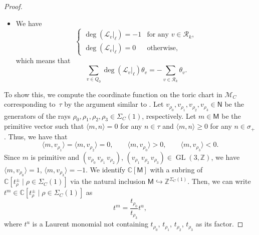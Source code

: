 \documentclass[10pt,a4paper]{amsart}
\numberwithin{equation}{section}
\theoremstyle{definition}
\newcommand{\ZZ}{\mathbb{Z}}
\newcommand{\CC}{\mathbb{C}}
\newcommand{\calL}{\mathcal{L}}
\newcommand{\calM}{\mathcal{M}}
\newcommand{\calR}{\mathcal{R}}
\newcommand{\sfM}{\mathsf{M}}
\newcommand{\sfN}{\mathsf{N}}
\newcommand{\GL}{\operatorname{GL}}
\begin{document}
\begin{proof}
\begin{itemize}
\begin{equation}
\begin{cases}
\deg(\calL_v |_\ell)=1 & \text{for any $v\in \calR_k$},\\
\deg(\calL_v |_\ell)=0 & \text{otherwise},
\end{cases}
\end{equation}
which means that
\begin{equation}
\label{eq_degree_linebdl_sum}
\sum_{v\in Q_0}\deg(\calL_v |_\ell)\theta_v=\sum_{v\in \calR_k}\theta_v.
\end{equation}
\item[(Case 2)] We have
\begin{equation}
\label{eq_degree_linebdl_main2}
\begin{cases}
\deg(\calL_v |_\ell)=-1 & \text{for any $v\in \calR_k$},\\
\deg(\calL_v |_\ell)=0 & \text{otherwise},
\end{cases}
\end{equation}
which means that
\begin{equation}\label{eq_degree_linebdl_sum2}
\sum_{v\in Q_0}\deg(\calL_v |_\ell)\theta_v=-\sum_{v\in \calR_k}\theta_v.
\end{equation}
\end{itemize}

To show this, we compute the coordinate function on the toric chart in $\calM_C$ corresponding to~$\tau$
by the argument similar to \cite[Proposition~4.9]{CHT}.
Let $v_{\rho_0}, v_{\rho_1}, v_{\rho_2}, v_{\rho_3}\in\sfN$ be the generators of the rays $\rho_0, \rho_1, \rho_2, \rho_3\in\Sigma_C(1)$, respectively.
Let $m\in\sfM$ be the primitive vector such that $\langle m, n\rangle=0$ for any $n\in\tau$ and $\langle m, n\rangle\ge0$ for any $n\in\sigma_+$.
Thus, we have that
\[
\langle m, v_{\rho_1}\rangle=\langle m, v_{\rho_2}\rangle=0, \qquad \langle m, v_{\rho_0}\rangle>0, \qquad \langle m, v_{\rho_3}\rangle<0.
\]
Since $m$ is primitive and $(v_{\rho_0}\, v_{\rho_1}\, v_{\rho_2})$, $(v_{\rho_1}\, v_{\rho_2}\, v_{\rho_3})\in\GL(3,\ZZ)$,
we have $\langle m, v_{\rho_0}\rangle=1$, $\langle m, v_{\rho_3}\rangle=-1$.
We identify $\CC[\sfM]$ with a subring of $\CC[t^{\pm}_\rho \mid \rho\in\Sigma_C(1)]$ via the natural inclusion
$\sfM\hookrightarrow \ZZ^{\Sigma_C(1)}$. Then, we can write $t^m\in \CC[t^{\pm}_\rho \mid \rho\in\Sigma_C(1)]$ as
\[
t^m=\frac{t_{\rho_0}}{t_{\rho_3}} t^u,
\]
where $t^u$ is a Laurent monomial not containing $t_{\rho_0}$, $t_{\rho_1}$, $t_{\rho_2}$, $t_{\rho_3}$ as its factor.


\end{proof}
\end{document}
